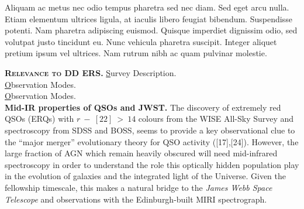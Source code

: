 \documentclass[11pt,epsf]{article}
\begin{document}
\noindent
Aliquam ac metus nec odio tempus pharetra sed nec diam. Sed eget arcu
nulla. Etiam elementum ultrices ligula, at iaculis libero feugiat
bibendum. Suspendisse potenti. Nam pharetra adipiscing
euismod. Quisque imperdiet dignissim odio, sed volutpat justo
tincidunt eu. Nunc vehicula pharetra suscipit. Integer aliquet pretium
ipsum vel ultrices. Nam rutrum nibh ac quam pulvinar molestie.


\medskip
\medskip

\smallskip
\smallskip
\noindent
\textbf{\textsc{Relevance to DD ERS.}} 
{\underline Survey Description.}\\

{\underline Observation Modes.}\\

{\underline Observation Modes.}\\




\smallskip
\smallskip
\noindent
{\bf Mid-IR properties of QSOs and JWST.} 
The discovery of extremely red QSOs (ERQs) with $r~-~[22]~>~14$
colours from the WISE All-Sky Survey and spectroscopy from SDSS and
BOSS, seems to provide a key observational clue to the ``major
merger'' evolutionary theory for QSO activity ([17],[24]).
However, the large fraction of AGN which remain heavily obscured will
need mid-infrared spectroscopy in order to understand the role this
optically hidden population play in the evolution of galaxies and the
integrated light of the Universe. Given the fellowship timescale, this
makes a natural bridge to the {\it James Webb Space Telescope} and
observations with the Edinburgh-built MIRI spectrograph.
\end{document}
